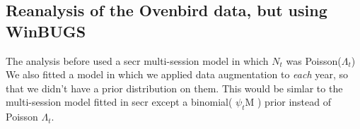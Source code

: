 \subsection{Reanalysis of the Ovenbird data, but using WinBUGS}


The analysis before used a secr multi-session model in which $N_{t}$
was Poisson($\Lambda_{t}$) We also fitted a model in which we applied
data augmentation to {\it each} year, so that we didn't have a prior
distribution on them.  This would be simlar to the multi-session model
fitted in secr except a binomial( $\psi_{t}$M ) prior instead of
Poisson $\Lambda_{t}$.

